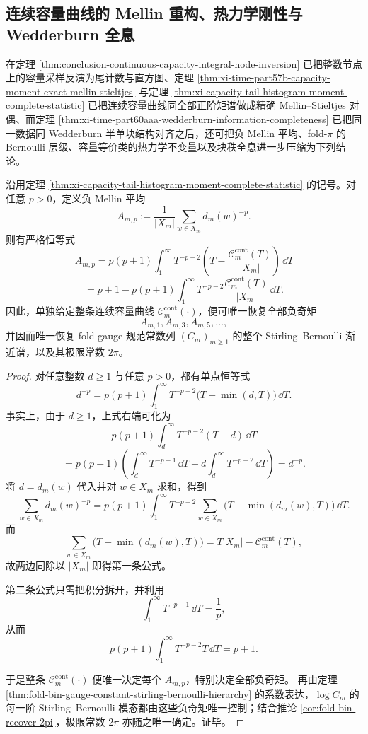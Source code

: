 \subsection{连续容量曲线的 Mellin 重构、热力学刚性与 Wedderburn 全息}\label{subsec:conclusion-capacity-mellin-thermodynamic-wedderburn-holography}
在定理 \ref{thm:conclusion-continuous-capacity-integral-node-inversion} 已把整数节点上的容量采样反演为尾计数与直方图、定理 \ref{thm:xi-time-part57b-capacity-moment-exact-mellin-stieltjes} 与定理 \ref{thm:xi-capacity-tail-histogram-moment-complete-statistic} 已把连续容量曲线同全部正阶矩谱做成精确 Mellin--Stieltjes 对偶、而定理 \ref{thm:xi-time-part60aaa-wedderburn-information-completeness} 已把同一数据同 Wedderburn 半单块结构对齐之后，还可把负 Mellin 平均、fold-\(\pi\) 的 Bernoulli 层级、容量等价类的热力学不变量以及块秩全息进一步压缩为下列结论。

\begin{theorem}\label{thm:conclusion-capacity-curve-mellin-complete-reconstruction}
沿用定理 \ref{thm:xi-capacity-tail-histogram-moment-complete-statistic} 的记号。对任意 \(p>0\)，定义负 Mellin 平均
\[
A_{m,p}:=\frac{1}{|X_m|}\sum_{w\in X_m}d_m(w)^{-p}.
\]
则有严格恒等式
\[
A_{m,p}
=
p(p+1)\int_{1}^{\infty}
T^{-p-2}\left(
T-\frac{\mathcal C_m^{\mathrm{cont}}(T)}{|X_m|}
\right)\,\dd T
\]
\[
=
p+1-p(p+1)\int_{1}^{\infty}
T^{-p-2}\frac{\mathcal C_m^{\mathrm{cont}}(T)}{|X_m|}\,\dd T.
\]
因此，单独给定整条连续容量曲线 \(\mathcal C_m^{\mathrm{cont}}(\cdot)\)，便可唯一恢复全部负奇矩
\[
A_{m,1},A_{m,3},A_{m,5},\dots,
\]
并因而唯一恢复 fold-gauge 规范常数列 \((C_m)_{m\ge 1}\) 的整个 Stirling--Bernoulli 渐近谱，以及其极限常数 \(2\pi\)。
\end{theorem}
\begin{proof}
对任意整数 \(d\ge 1\) 与任意 \(p>0\)，都有单点恒等式
\[
d^{-p}
=
p(p+1)\int_{1}^{\infty}T^{-p-2}\bigl(T-\min(d,T)\bigr)\,\dd T.
\]
事实上，由于 \(d\ge 1\)，上式右端可化为
\[
p(p+1)\int_d^\infty T^{-p-2}(T-d)\,\dd T
\]
\[
=
p(p+1)\left(
\int_d^\infty T^{-p-1}\,\dd T
-d\int_d^\infty T^{-p-2}\,\dd T
\right)
=
d^{-p}.
\]
将 \(d=d_m(w)\) 代入并对 \(w\in X_m\) 求和，得到
\[
\sum_{w\in X_m}d_m(w)^{-p}
=
p(p+1)\int_1^\infty
T^{-p-2}\sum_{w\in X_m}\bigl(T-\min(d_m(w),T)\bigr)\,\dd T.
\]
而
\[
\sum_{w\in X_m}\bigl(T-\min(d_m(w),T)\bigr)
=
T|X_m|-\mathcal C_m^{\mathrm{cont}}(T),
\]
故两边同除以 \(|X_m|\) 即得第一条公式。

第二条公式只需把积分拆开，并利用
\[
\int_1^\infty T^{-p-1}\,\dd T=\frac{1}{p},
\]
从而
\[
p(p+1)\int_1^\infty T^{-p-2}T\,\dd T=p+1.
\]

于是整条 \(\mathcal C_m^{\mathrm{cont}}(\cdot)\) 便唯一决定每个 \(A_{m,p}\)，特别决定全部负奇矩。
再由定理 \ref{thm:fold-bin-gauge-constant-stirling-bernoulli-hierarchy} 的系数表达，\(\log C_m\) 的每一阶 Stirling--Bernoulli 模态都由这些负奇矩唯一控制；结合推论 \ref{cor:fold-bin-recover-2pi}，极限常数 \(2\pi\) 亦随之唯一确定。证毕。
\end{proof}

